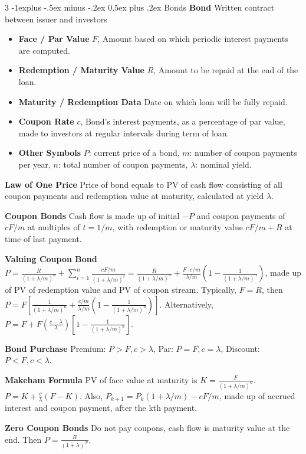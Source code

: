 \documentclass[10pt, landscape]{article}
\makeatletter
\renewcommand{\section}{\@startsection{section}{1}{0mm}%
                                {-1ex plus -.5ex minus -.2ex}%
                                {0.5ex plus .2ex}%
                                {\normalfont\large\bfseries}}
\renewcommand{\section}{\@startsection{section}{2}{0mm}%
                                {-1explus -.5ex minus -.2ex}%
                                {0.5ex plus .2ex}%
                                {\normalfont\normalsize\bfseries}}
\makeatother
\begin{document}
\begin{multicols*}{3}
\section{Bonds}
\textbf{Bond} Written contract between issuer and investors

\begin{itemize}
    \item \textbf{Face / Par Value} $F$, Amount based on which periodic interest payments are computed.
    \item \textbf{Redemption / Maturity Value} $R$, Amount to be repaid at the end of the loan.
    \item \textbf{Maturity / Redemption Data} Date on which loan will be fully repaid.
    \item \textbf{Coupon Rate} $c$, Bond's interest payments, as a percentage of par value, made to investors at regular intervals during term of loan.
    \item \textbf{Other Symbols} $P$: current price of a bond, $m$: number of coupon payments per year, $n$: total number of coupon payments, $\lambda$: nominal yield.
\end{itemize}

\textbf{Law of One Price} Price of bond equals to PV of cash flow consisting of all coupon payments and redemption value at maturity, calculated at yield $\lambda$.

\textbf{Coupon Bonds} Cash flow is made up of initial $-P$ and coupon payments of $cF/m$ at multiples of $t=1/m$, with redemption or maturity value $cF/m + R$ at time of last payment.

\textbf{Valuing Coupon Bond} $P=\frac{R}{(1+\lambda/m)^n}+\sum_{i=1}^n\frac{cF/m}{(1+\lambda/m)^i}=\frac{R}{(1+\lambda/m)^n}+\frac{F\cdot c/m}{\lambda/m}(1-\frac{1}{(1+\lambda/m)^n})$, made up of PV of redemption value and PV of coupon stream. Typically, $F=R$, then $P=F[\frac{1}{(1+\lambda/m)^n}+\frac{c/m}{\lambda/m}(1-\frac{1}{(1+\lambda/m)^n})]$. Alternatively, $P=F+F(\frac{c-\lambda}{\lambda})[1-\frac{1}{(1+\lambda/m)^n}]$.

\textbf{Bond Purchase} Premium: $P>F, c > \lambda$, Par: $P=F, c=\lambda$, Discount: $P<F, c < \lambda$.

\textbf{Makeham Formula} PV of face value at maturity is $K=\frac{F}{(1+\lambda/m)^n}$. $P=K+\frac{c}{\lambda}(F-K)$. Also, $P_{k+1}=P_k(1+\lambda/m)-cF/m$, made up of accrued interest and coupon payment, after the kth payment.

\textbf{Zero Coupon Bonds} Do not pay coupons, cash flow is maturity value at the end. Then $P=\frac{R}{(1+\lambda)^N}$.


\end{multicols*}
\end{document}
